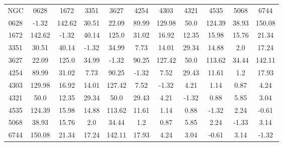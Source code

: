 \begin{table}
\begin{tabular}{ccccccccccc}
NGC & 0628 & 1672 & 3351 & 3627 & 4254 & 4303 & 4321 & 4535 & 5068 & 6744 \\
0628 & -1.32 & 142.62 & 30.51 & 22.09 & 89.99 & 129.98 & 50.0 & 124.39 & 38.93 & 150.08 \\
1672 & 142.62 & -1.32 & 40.14 & 125.0 & 31.02 & 16.92 & 12.35 & 15.98 & 15.76 & 21.34 \\
3351 & 30.51 & 40.14 & -1.32 & 34.99 & 7.73 & 14.01 & 29.34 & 14.88 & 2.0 & 17.24 \\
3627 & 22.09 & 125.0 & 34.99 & -1.32 & 90.25 & 127.42 & 50.0 & 113.62 & 34.44 & 142.11 \\
4254 & 89.99 & 31.02 & 7.73 & 90.25 & -1.32 & 7.52 & 29.43 & 11.61 & 1.2 & 17.93 \\
4303 & 129.98 & 16.92 & 14.01 & 127.42 & 7.52 & -1.32 & 4.21 & 1.14 & 0.87 & 4.24 \\
4321 & 50.0 & 12.35 & 29.34 & 50.0 & 29.43 & 4.21 & -1.32 & 0.88 & 5.85 & 3.04 \\
4535 & 124.39 & 15.98 & 14.88 & 113.62 & 11.61 & 1.14 & 0.88 & -1.32 & 2.24 & -0.61 \\
5068 & 38.93 & 15.76 & 2.0 & 34.44 & 1.2 & 0.87 & 5.85 & 2.24 & -1.33 & 3.14 \\
6744 & 150.08 & 21.34 & 17.24 & 142.11 & 17.93 & 4.24 & 3.04 & -0.61 & 3.14 & -1.32 \\
\end{tabular}
\end{table}
